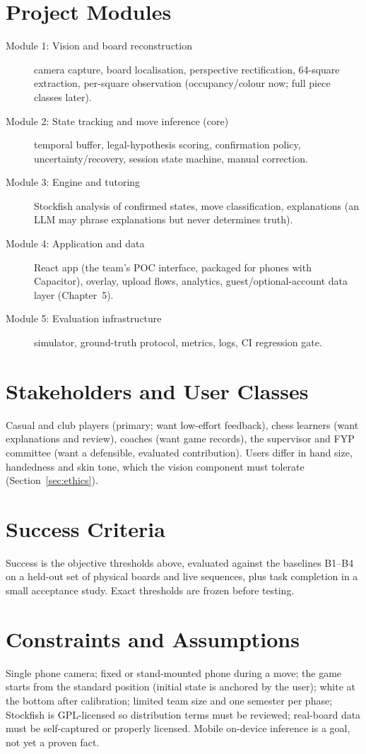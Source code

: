 \section{Project Modules}
\begin{description}
\item[Module 1: Vision and board reconstruction] camera capture, board localisation, perspective rectification, 64-square extraction, per-square observation (occupancy/colour now; full piece classes later).
\item[Module 2: State tracking and move inference (core)] temporal buffer, legal-hypothesis scoring, confirmation policy, uncertainty/recovery, session state machine, manual correction.
\item[Module 3: Engine and tutoring] Stockfish analysis of confirmed states, move classification, explanations (an LLM may phrase explanations but never determines truth).
\item[Module 4: Application and data] React app (the team's POC interface, packaged for phones with Capacitor), overlay, upload flows, analytics, guest/optional-account data layer (Chapter~5).
\item[Module 5: Evaluation infrastructure] simulator, ground-truth protocol, metrics, logs, CI regression gate.
\end{description}

\section{Stakeholders and User Classes}
Casual and club players (primary; want low-effort feedback), chess learners (want explanations and review), coaches
(want game records), the supervisor and FYP committee (want a defensible, evaluated contribution). Users
differ in hand size, handedness and skin tone, which the vision component must tolerate (Section~\ref{sec:ethics}).

\section{Success Criteria}
Success is the objective thresholds above, evaluated against the baselines B1--B4 on a held-out set of physical boards
and live sequences, plus task completion in a small acceptance study. Exact thresholds are frozen before testing.

\section{Constraints and Assumptions}
Single phone camera; fixed or stand-mounted phone during a move; the game starts from the standard position
(initial state is anchored by the user); white at the bottom after calibration; limited team size and one semester
per phase; Stockfish is GPL-licensed so distribution terms must be reviewed; real-board data must be self-captured or
properly licensed. Mobile on-device inference is a goal, not yet a proven fact.

